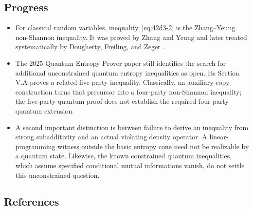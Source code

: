 \subsection*{Progress}

\begin{itemize}
  \item For classical random variables, inequality~\eqref{eq:42d3-2} is the Zhang--Yeung non-Shannon inequality. It was proved by Zhang and Yeung and later treated systematically by Dougherty, Freiling, and Zeger .

  \item The 2025 Quantum Entropy Prover paper still identifies the search for additional unconstrained quantum entropy inequalities as open. Its Section V.A proves a related five-party inequality. Classically, an auxiliary-copy construction turns that precursor into a four-party non-Shannon inequality; the five-party quantum proof does not establish the required four-party quantum extension. 

  \item A second important distinction is between failure to derive an inequality from strong subadditivity and an actual violating density operator. A linear-programming witness outside the basic entropy cone need not be realizable by a quantum state. Likewise, the known constrained quantum inequalities, which assume specified conditional mutual informations vanish, do not settle this unconstrained question. 
\end{itemize}

\subsection*{References}

